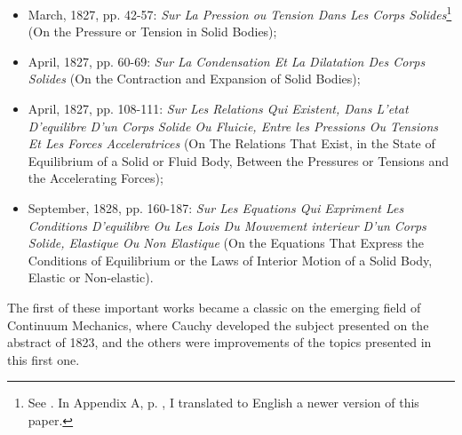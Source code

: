 \begin{itemize}
	\setlength\itemsep{1pt}
	\item[1.] March, 1827, pp. 42-57: \emph{Sur La Pression ou Tension Dans Les Corps Solides}\footnote{See \cite{cauchy_1827}. In Appendix A, p. \pageref{ch:appA}, I translated to English a newer version of this paper.} (On the Pressure or Tension in Solid Bodies);
	\item[2.] April, 1827, pp. 60-69: \emph{Sur La Condensation Et La Dilatation Des Corps Solides} (On the Contraction and Expansion of Solid Bodies);
    \item[3.] April, 1827, pp. 108-111: \emph{Sur Les Relations Qui Existent, Dans L'etat D'equilibre D'un Corps Solide Ou Fluicie, Entre
les Pressions Ou Tensions Et Les Forces Acceleratrices} (On The Relations That Exist, in the State of Equilibrium of a Solid or Fluid Body, Between the Pressures or Tensions and the Accelerating Forces);
	\item[4.] September, 1828, pp. 160-187: \emph{Sur Les Equations Qui Expriment Les Conditions D'equilibre Ou Les Lois Du Mouvement interieur D'un Corps Solide, Elastique Ou Non Elastique} (On the Equations That Express the Conditions of Equilibrium or the Laws of Interior Motion of a Solid Body, Elastic or Non-elastic).
\end{itemize}
The first of these important works became a classic on the emerging field of Continuum Mechanics, where Cauchy developed the subject presented on the abstract of 1823, and the others were improvements of the topics presented in this first one.
